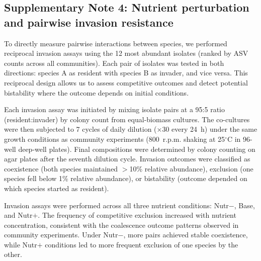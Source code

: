 \subsection*{Supplementary Note 4: Nutrient perturbation and pairwise invasion resistance}
\label{sec:suppl:note4}

To directly measure pairwise interactions between species, we performed reciprocal invasion assays using the 12 most abundant isolates (ranked by ASV counts across all communities). Each pair of isolates was tested in both directions: species A as resident with species B as invader, and vice versa. This reciprocal design allows us to assess competitive outcomes and detect potential bistability where the outcome depends on initial conditions.

Each invasion assay was initiated by mixing isolate pairs at a 95:5 ratio (resident:invader) by colony count from equal-biomass cultures. The co-cultures were then subjected to 7 cycles of daily dilution ($\times$30 every 24~h) under the same growth conditions as community experiments (800~r.p.m. shaking at 25$^\circ$C in 96-well deep-well plates). Final compositions were determined by colony counting on agar plates after the seventh dilution cycle. Invasion outcomes were classified as coexistence (both species maintained $>$10\% relative abundance), exclusion (one species fell below 1\% relative abundance), or bistability (outcome depended on which species started as resident).

Invasion assays were performed across all three nutrient conditions: Nutr$-$, Base, and Nutr$+$. The frequency of competitive exclusion increased with nutrient concentration, consistent with the coalescence outcome patterns observed in community experiments. Under Nutr$-$, more pairs achieved stable coexistence, while Nutr$+$ conditions led to more frequent exclusion of one species by the other.
